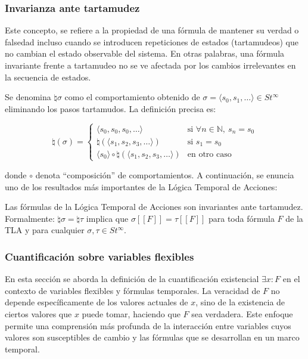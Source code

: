 \subsubsection{Invarianza ante tartamudez}\label{subsubsection:LTAsttutering}
Este concepto, se refiere a la propiedad de una fórmula de mantener su verdad o falsedad incluso cuando se introducen repeticiones de estados (tartamudeos) que no cambian el estado observable del sistema. En otras palabras, una fórmula invariante frente a tartamudeo no se ve afectada por los cambios irrelevantes en la secuencia de estados.

Se denomina $\natural \sigma$ como el comportamiento obtenido de $\sigma = \langle s_0, s_1, \ldots \rangle \in St^\infty$ eliminando los pasos tartamudos. La definición precisa es:

\[
\natural(\sigma) = 
\begin{cases} 
\langle s_0, s_0, s_0, \ldots \rangle & \text{si } \forall n \in \mathbb{N},\ s_n = s_0 \\
\natural(\langle s_{1}, s_2, s_3, \ldots \rangle) & \text{si } s_1 = s_0 \\
\langle s_0 \rangle \circ \natural(\langle s_{1}, s_2, s_3, \ldots \rangle) & \text{en otro caso}
\end{cases}
\]

donde $\circ$ denota ``composición'' de comportamientos. A continuación, se enuncia uno de los resultados más importantes de la Lógica Temporal de Acciones:
\begin{proposicion}
    Las fórmulas de la Lógica Temporal de Acciones son invariantes ante tartamudez. Formalmente: $\natural \sigma = \natural \tau$ implica que $\sigma[[F]] = \tau[[F]]$ para toda fórmula $F$ de la TLA y para cualquier $\sigma,\tau \in St^\infty$.
\end{proposicion}

\subsubsection{Cuantificación sobre variables flexibles}
En esta sección se aborda la definición de la cuantificación existencial $\exists x: F$ en el contexto de variables flexibles y fórmulas temporales. La veracidad de $F$ no depende específicamente de los valores actuales de $x$, sino de la existencia de ciertos valores que $x$ puede tomar, haciendo que $F$ sea verdadera. Este enfoque permite una comprensión más profunda de la interacción entre variables cuyos valores son susceptibles de cambio y las fórmulas que se desarrollan en un marco temporal.

